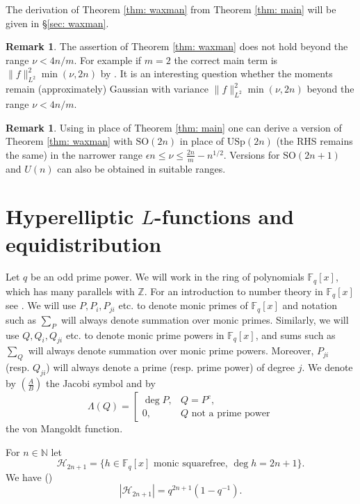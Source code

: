 \documentclass[alphabetic, 
        colorlinks,
        linkcolor=red,  citecolor=blue,
        backref
]{amsart}
\numberwithin{equation}{section}
\theoremstyle{definition}
\newtheorem{rem}[claim]{Remark}
\newcommand{\N}{{\mathbb N}}
\newcommand{\Z}{{\mathbb Z}}
\newcommand{\USp}{{\mathrm{USp}}}
\newcommand{\SO}{{\mathrm{SO}}}
\newcommand{\F}{\mathbb{F}}
\begin{document}
The derivation of Theorem \ref{thm: waxman} from Theorem \ref{thm: main} will be given in \S\ref{sec: waxman}.

\begin{rem}
    The assertion of Theorem \ref{thm: waxman} does not hold beyond the range $\nu<4n/m$. For example if $m=2$ the correct main term is $\|f\|_{L^2}^2\min(\nu,2n)$ by \cite[Proposition 5.3]{RuWa19}. It is an interesting question whether the moments remain (approximately) Gaussian with variance $\|f\|_{L^2}^2\min(\nu,2n)$ beyond the range $\nu<4n/m$.
\end{rem}

\begin{rem} Using \cite[Theorem 3(ii)]{HuRu03} in place of Theorem \ref{thm: main} one can derive a version of Theorem \ref{thm: waxman} with $\SO(2n)$ in place of $\USp(2n)$ (the RHS remains the same) in the narrower range $\epsilon n\le \nu\le\frac{2n}m-n^{1/2}$. Versions for $\SO(2n+1)$ and $U(n)$ can also be obtained in suitable ranges.\end{rem} 




\section{Hyperelliptic $L$-functions and equidistribution}
\label{sec: hyperelliptic}

Let $q$ be an odd prime power. We will work in the ring of polynomials $\F_q[x]$, which has many parallels with $\Z$. For an introduction to number theory in $\F_q[x]$ see \cite{Ros02}. We will use $P, P_i, P_{ji}$ etc. to denote monic primes of $\F_q[x]$ and notation such as $\sum_P$ will always denote summation over monic primes.
Similarly, we will use $Q,Q_i,Q_{ji}$ etc. to denote monic prime powers in $\F_q[x]$, and sums such as $\sum_Q$ will always denote summation over monic prime powers. Moreover, $P_{ji}$ (resp. $Q_{ji}$) will always denote a prime (resp. prime power) of degree $j$. We denote by $\left(\frac AB\right)$ the Jacobi symbol and by
$$\Lambda(Q)=\left[\begin{array}{ll}\deg P,&Q=P^e,\\0,&Q\mbox{ not a prime power}\end{array}\right.$$
the von Mangoldt function. 

For $n\in\N$ let
\begin{equation}\label{eq: def H}\mathcal H_{2n+1}=\{h\in\F_q[x]\mbox{ monic squarefree},\,\deg h=2n+1\}.\end{equation} We have (\cite[Proposition 2.3]{Ros02})
\begin{equation}\label{eq: num sqfree}|\mathcal H_{2n+1}|=q^{2n+1}(1-q^{-1}).\end{equation}
\end{document}
